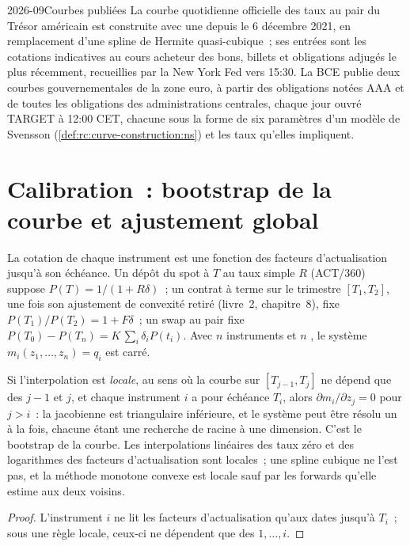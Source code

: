 \begin{dated}{2026-09}{Courbes publiées}\label{dat:rc:curve-construction:published}
La courbe quotidienne officielle des taux au pair du Trésor américain est construite avec une
 depuis le 6 décembre 2021, en remplacement d'une spline de
Hermite quasi-cubique~; ses entrées sont les cotations indicatives au cours acheteur des
bons, billets et obligations adjugés le plus récemment, recueillies par la New York Fed vers 15:30.
La BCE publie deux courbes gouvernementales de la zone euro, à partir des obligations notées AAA et
de toutes les obligations des administrations centrales, chaque jour ouvré TARGET à 12:00 CET,
chacune sous la forme de six paramètres d'un modèle de Svensson
(\cref{def:rc:curve-construction:ns}) et les taux qu'elles impliquent.
\end{dated}

\section{Calibration~: bootstrap de la courbe et ajustement global}

La cotation de chaque instrument est une fonction des facteurs d'actualisation jusqu'à son
échéance. Un dépôt du spot à $T$ au taux simple $R$ (ACT/360) suppose
$P(T) = 1/(1+R\delta)$~; un contrat à terme sur le trimestre $[T_1,T_2]$, une fois
son ajustement de convexité retiré (livre~2, chapitre~8), fixe
$P(T_1)/P(T_2) = 1+F\delta$~; un swap au pair fixe $P(T_0)-P(T_n)=K\,\sum_i
\delta_iP(t_i)$. Avec $n$ instruments et $n$ , le système
$m_i(z_1,\dots,z_n)=q_i$ est carré.

\begin{proposition}\label{prop:rc:curve-construction:triangular}
Si l'interpolation est \emph{locale}, au sens où la courbe sur
$[T_{j-1},T_j]$ ne dépend que des  $j-1$ et $j$, et chaque instrument
$i$ a pour échéance $T_i$, alors $\partial m_i/\partial z_j = 0$ pour $j>i$~: la
jacobienne est triangulaire inférieure, et le système peut être résolu un  à la
fois, chacune étant une recherche de racine à une dimension. C'est le bootstrap de la courbe. Les interpolations
linéaires des taux zéro et des logarithmes des facteurs d'actualisation sont locales~; une
spline cubique ne l'est pas, et la méthode monotone convexe est locale sauf par les
forwards qu'elle estime aux deux  voisins.
\end{proposition}
\begin{proof}
L'instrument $i$ ne lit les facteurs d'actualisation qu'aux dates jusqu'à $T_i$~; sous une règle
locale, ceux-ci ne dépendent que des  $1,\dots,i$.
\end{proof}

